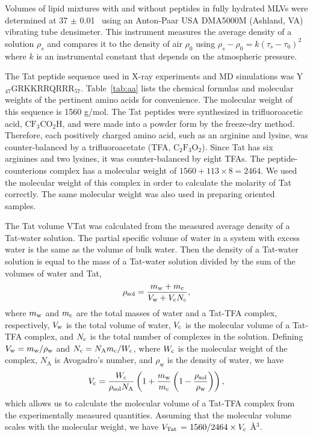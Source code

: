 Volumes of lipid mixtures with and without peptides in fully hydrated 
MLVs were determined at 37 $\pm$ 0.01 \textcelsius\ 
using an Anton-Paar USA DMA5000M (Ashland, VA) vibrating tube densimeter. 
This instrument measures the average density of a solution $\rho_s$
and compares it to
the density of air $\rho_0$ using $\rho_s-\rho_0=k(\tau_s-\tau_0)^2$ where $k$ is
an instrumental constant that depends on the atmospheric pressure. 

The Tat peptide sequence used in X-ray experiments and MD simulations was 
Y$_{47}$GRKKRRQRRR$_{57}$. Table~\ref{tab:aa} lists the chemical formulas and 
molecular weights of the pertinent amino acids for convenience. 
The molecular weight of this sequence is 1560 g/mol.
The Tat peptides were synthesized in trifluoroacetic acid, $\mathrm{CF_3CO_2H}$, 
and were made into a powder form by the 
freeze-dry method. Therefore, each positively charged amino acid, such as 
an arginine and lysine, was counter-balanced by a trifluoroacetate (\acs{TFA}, 
$\mathrm{C_2F_3O_2}$). Since Tat has six arginines and two lysines, 
it was counter-balanced by eight TFAs. 
The peptide-counterions complex has a molecular weight of 
$1560+113\times 8=2464$. We used the 
molecular weight of this complex in order to calculate the molarity of Tat
correctly. The same molecular weight was also used in preparing oriented 
samples.

The Tat volume \gls{VTat} was calculated from the measured average density of a 
Tat-water solution. 
The partial specific volume of water in a system with excess water is the same 
as the volume of bulk water. Then the density
of a Tat-water solution is equal to the mass of a Tat-water solution divided
by the sum of the volumes of water and Tat, 
\begin{equation}
  \rho_\textrm{sol} = \frac{m_\textrm{w}+m_\textrm{c}}{V_\textrm{w}+V_\textrm{c}N_\textrm{c}},
\end{equation}
where $m_\textrm{w}$ and $m_\textrm{c}$
are the total masses of water and a Tat-TFA complex, respectively, 
$V_\textrm{w}$ is the total volume of 
water, $V_\textrm{c}$ is the molecular volume of a Tat-TFA complex, and $N_\textrm{c}$ is the total number 
of complexes in the solution. 
Defining $V_\textrm{w}=m_\textrm{w}/\rho_\textrm{w}$ 
and $N_\textrm{c}=N_\textrm{A}m_\textrm{c}/W_\textrm{c}$, 
where $W_\textrm{c}$ is the molecular weight of the complex, 
$N_\textrm{A}$ is Avogadro's number,
and $\rho_\textrm{w}$ is the density of water, we have
\begin{equation}
  V_\textrm{c} = \frac{W_\textrm{c}}{\rho_\textrm{sol}N_\textrm{A}} \left( 
        1 + \frac{m_\textrm{w}}{m_\textrm{c}}\left(1-\frac{\rho_\textrm{sol}}{\rho_\textrm{w}}\right) 
        \right),
\end{equation}
which allows us to calculate the molecular volume of a Tat-TFA complex 
from the experimentally measured quantities. 
Assuming that the molecular
volume scales with the molecular weight, we have  
$V_\textrm{Tat}$ = $1560/2464\times V_\textrm{c}$ \AA$^3$. 


